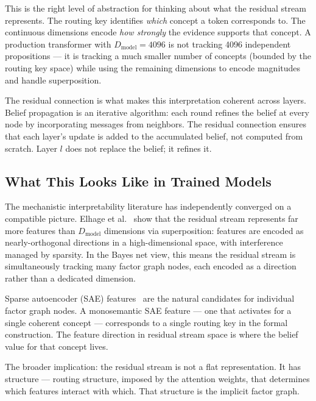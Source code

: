 This is the right level of abstraction for thinking about what the residual stream
represents. The routing key identifies \emph{which} concept a token corresponds to.
The continuous dimensions encode \emph{how strongly} the evidence supports that
concept. A production transformer with $D_{\mathrm{model}} = 4096$ is not tracking
4096 independent propositions --- it is tracking a much smaller number of concepts
(bounded by the routing key space) while using the remaining dimensions to encode
magnitudes and handle superposition.

The residual connection is what makes this interpretation coherent across layers.
Belief propagation is an iterative algorithm: each round refines the belief at every
node by incorporating messages from neighbors. The residual connection ensures that
each layer's update is added to the accumulated belief, not computed from scratch.
Layer $l$ does not replace the belief; it refines it.

\subsection*{What This Looks Like in Trained Models}

The mechanistic interpretability literature has independently converged on a
compatible picture. Elhage et al.~\cite{elhage2022superposition} show that the
residual stream represents far more features than $D_{\mathrm{model}}$ dimensions
via superposition: features are encoded as nearly-orthogonal directions in a
high-dimensional space, with interference managed by sparsity. In the Bayes net
view, this means the residual stream is simultaneously tracking many factor graph
nodes, each encoded as a direction rather than a dedicated dimension.

Sparse autoencoder (SAE) features~\cite{templeton2024monosemanticity} are the
natural candidates for individual factor graph nodes. A monosemantic SAE feature ---
one that activates for a single coherent concept --- corresponds to a single routing
key in the formal construction. The feature direction in residual stream space is
where the belief value for that concept lives.

The broader implication: the residual stream is not a flat representation. It has
structure --- routing structure, imposed by the attention weights, that determines
which features interact with which. That structure is the implicit factor graph.
